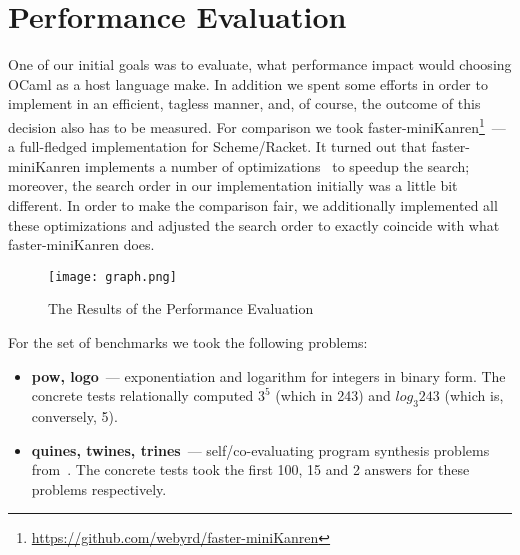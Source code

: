 
\section{Performance Evaluation}
\label{sec:evaluation}

One of our initial goals was to evaluate, what performance impact would choosing OCaml as a host language make. In addition we spent some 
efforts in order to implement \miniKanren in an efficient, tagless manner, and, of course, the outcome of this decision also has to be 
measured. For comparison we took faster-miniKanren\footnote{\url{https://github.com/webyrd/faster-miniKanren}}~--- a full-fledged 
\miniKanren implementation for Scheme/Racket. It turned out that faster-miniKanren implements a number of optimizations~\cite{WillThesis, Optimizations} 
to speedup the search; moreover, the search order in our implementation initially was a little bit different. In order to make the comparison
fair, we additionally implemented all these optimizations and adjusted the search order to exactly coincide with 
what faster-miniKanren does.

\begin{figure}[t]
\centering
\texttt{[image: graph.png]}
\caption{The Results of the Performance Evaluation}
\label{eval}
\end{figure}

\FloatBarrier 

For the set of benchmarks we took the following problems:

\begin{itemize}
\item \textbf{pow, logo}~--- exponentiation and logarithm for integers in binary form. The concrete tests relationally computed
$3^5$ (which in 243) and $log_3 243$ (which is, conversely, 5).
\item \textbf{quines, twines, trines}~--- self/co-evaluating program synthesis problems from~\cite{Untagged}. The
concrete tests took the first 100, 15 and 2 answers for these problems respectively.
\end{itemize}


